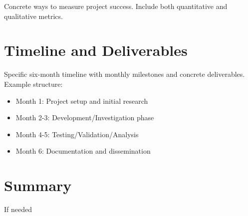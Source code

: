 \documentclass[letterpaper, 11pt]{article}
\begin{document}
Concrete ways to measure project success.
Include both quantitative and qualitative metrics.

\section{Timeline and Deliverables}

Specific six-month timeline with monthly milestones and concrete deliverables.
Example structure:

\begin{itemize}
  \item Month 1: Project setup and initial research
  \item Month 2-3: Development/Investigation phase
  \item Month 4-5: Testing/Validation/Analysis
  \item Month 6: Documentation and dissemination
\end{itemize}

\section{Summary}

If needed

%
\vspace*{-0.25cm}
\begin{footnotesize}
%
%
\end{footnotesize}
\end{document}
